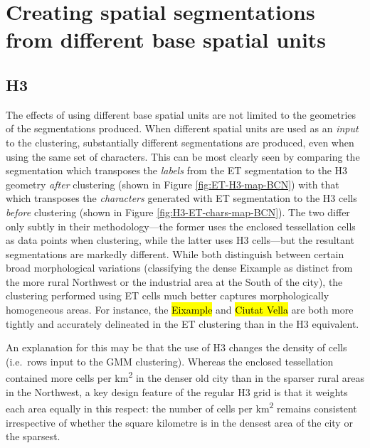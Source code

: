 \documentclass[a4paper, nobind]{templates/ociamthesis}
\begin{document}
\hypertarget{creating-spatial-segmentations-from-different-base-spatial-units}{%
\section{Creating spatial segmentations from different base spatial units}\label{creating-spatial-segmentations-from-different-base-spatial-units}}

\hypertarget{h3-1}{%
\subsection{H3}\label{h3-1}}

The effects of using different base spatial units are not limited to the geometries of the segmentations produced. When different spatial units are used as an \emph{input} to the clustering, substantially different segmentations are produced, even when using the same set of characters. This can be most clearly seen by comparing the segmentation which transposes the \emph{labels} from the ET segmentation to the H3 geometry \emph{after} clustering (shown in Figure \ref{fig:ET-H3-map-BCN}) with that which transposes the \emph{characters} generated with ET segmentation to the H3 cells \emph{before} clustering (shown in Figure \ref{fig:H3-ET-chars-map-BCN}). The two differ only subtly in their methodology---the former uses the enclosed tessellation cells as data points when clustering, while the latter uses H3 cells---but the resultant segmentations are markedly different. While both distinguish between certain broad morphological variations (classifying the dense Eixample as distinct from the more rural Northwest or the industrial area at the South of the city), the clustering performed using ET cells much better captures morphologically homogeneous areas. For instance, the \hl{Eixample} and \hl{Ciutat Vella} are both more tightly and accurately delineated in the ET clustering than in the H3 equivalent.

An explanation for this may be that the use of H3 changes the density of cells (i.e.~rows input to the GMM clustering). Whereas the enclosed tessellation contained more cells per km\textsuperscript{2} in the denser old city than in the sparser rural areas in the Northwest, a key design feature of the regular H3 grid is that it weights each area equally in this respect: the number of cells per km\textsuperscript{2} remains consistent irrespective of whether the square kilometre is in the densest area of the city or the sparsest.
\end{document}
